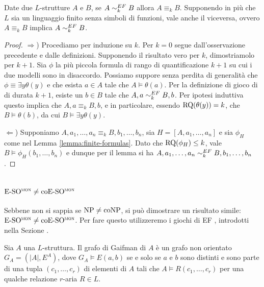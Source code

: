 \begin{teorema}
 Date due $L$-strutture $A$ e $B$, se $A \sim^{EF}_k B$ allora $A \equiv_k B$.
 Supponendo in più che $L$ sia un linguaggio finito senza simboli di funzioni,
 vale anche il viceversa, ovvero $A \equiv_k B$
 implica $A \sim^{EF}_k B$.
\end{teorema}
\begin{proof}
 $\Rightarrow$) Procediamo per induzione su $k$. Per $k=0$ segue dall'osservazione
 precedente e dalle definizioni. Supponendo il risultato vero per $k$, dimostriamolo
 per $k+1$. Sia $\phi$ la più piccola formula di rango di quantificazione $k+1$
 su cui i due modelli sono in disaccordo. Possiamo suppore senza perdita di generalità
 che $\phi \equiv \exists y \theta(y)$ e che esista $a \in A$ tale che $A \models \theta(a)$.
 Per la definizione di gioco di \EF{} di durata $k+1$, esiste un $b \in B$ tale che
 $A,a \sim^{EF}_k B,b$. Per ipotesi induttiva questo implica che
 $A,a \equiv_k B,b$, e in particolare, essendo $\operatorname{RQ}(\theta(y)) = k$, che
 $B \models \theta(b)$, da cui $B \models \exists y \theta(y)$.
 
 $\Leftarrow$) Supponiamo $A,a_1,\ldots, a_n \equiv_k B, b_1, \ldots, b_n$, sia
 $H=[A,a_1,\ldots,a_n]$ e sia $\phi_H$ come nel Lemma \ref{lemma:finite-formulas}.
 Dato che $\operatorname{RQ}(\phi_H) \leq k$, vale $B \models \phi_H(b_1,\ldots,b_n)$
 e dunque per il lemma si ha $A,a_1,\ldots, a_n \sim^{EF}_k B, b_1, \ldots, b_n$.
\end{proof}


\section{\texorpdfstring{$\operatorname{E-SO^{\normalfont\textsc{mon}}} \neq \operatorname{coE-SO^{\normalfont\textsc{mon}}}$}{ESOmon not equal to coESOmon}}

Sebbene non si sappia se $\operatorname{NP}\neq\operatorname{coNP}$, si può dimostrare un risultato simile: $\operatorname{E-SO^{\normalfont\textsc{mon}}} \neq \operatorname{coE-SO^{\normalfont\textsc{mon}}}$.
Per fare questo utilizzeremo i giochi di EF , introdotti nella Sezione .


\begin{definizione}
  Sia $A$ una $L$-struttura.
  Il grafo di Gaifman di $A$ è un grafo non orientato $G_A = (|A|, E^A)$, dove $G_A \models E(a,b)$ se e solo se $a$ e $b$ sono distinti e sono parte di una tupla $(c_1,\dots,c_r)$ di elementi di $A$ tali che $A\models R(c_1,\dots,c_r)$ per una qualche relazione $r$-aria $R\in L$.
\end{definizione}

